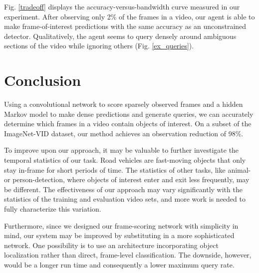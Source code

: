 \documentclass[10pt,twocolumn,letterpaper]{article}
\begin{document}
Fig. \ref{tradeoff} displays the accuracy-versus-bandwidth curve measured in our experiment. After observing only 2\% of the frames in a video, our agent is able to make frame-of-interest predictions with the same accuracy as an unconstrained detector. Qualitatively, the agent seems to query densely around ambiguous sections of the video while ignoring others (Fig. \ref{ex_queries}).

\section{Conclusion}

Using a convolutional network to score sparsely observed frames and a hidden Markov model to make dense predictions and generate queries, we can accurately determine which frames in a video contain objects of interest. On a subset of the ImageNet-VID dataset, our method achieves an observation reduction of 98\%.

To improve upon our approach, it may be valuable to further investigate the temporal statistics of our task. Road vehicles are fast-moving objects that only stay in-frame for short periods of time. The statistics of other tasks, like animal- or person-detection, where objects of interest enter and exit less frequently, may be different. The effectiveness of our approach may vary significantly with the statistics of the training and evaluation video sets, and more work is needed to fully characterize this variation.

Furthermore, since we designed our frame-scoring network with simplicity in mind, our system may be improved by substituting in a more sophisticated network. One possibility is to use an architecture incorporating object localization rather than direct, frame-level classification. The downside, however, would be a longer run time and consequently a lower maximum query rate.


{\small }
\end{document}
